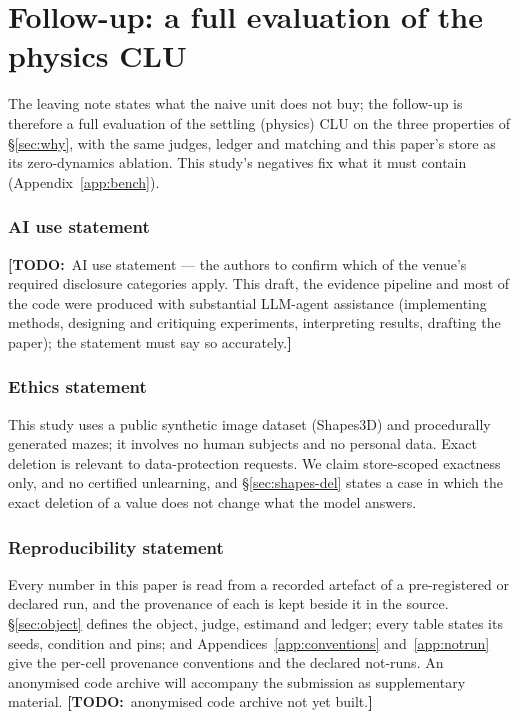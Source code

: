 \documentclass{article} %
\newcommand{\TODO}[1]{{\color{orange}\textbf{[TODO:}~#1\textbf{]}}}
\begin{document}
\section{Follow-up: a full evaluation of the physics CLU}
\label{sec:followup}

The leaving note states what the naive unit does not buy; the follow-up is therefore a full evaluation of the settling (physics) CLU on the three properties of \S\ref{sec:why}, with the same judges, ledger and matching and this paper's store as its zero-dynamics ablation. This study's negatives fix what it must contain (Appendix~\ref{app:bench}).

\subsubsection*{AI use statement}
\TODO{AI use statement --- the authors to confirm which of the venue's required disclosure categories
apply. This draft, the evidence pipeline and most of the code were produced with substantial LLM-agent
assistance (implementing methods, designing and critiquing experiments, interpreting results,
drafting the paper); the statement must say so accurately.}

\subsubsection*{Ethics statement}
This study uses a public synthetic image dataset (Shapes3D) and procedurally generated mazes; it
involves no human subjects and no personal data. Exact deletion is relevant to data-protection
requests. We claim store-scoped exactness only, and no certified unlearning, and
\S\ref{sec:shapes-del} states a case in which the exact deletion of a value does not change what
the model answers.

\subsubsection*{Reproducibility statement}
Every number in this paper is read from a recorded artefact of a pre-registered or declared run,
and the provenance of each is kept beside it in the source. \S\ref{sec:object} defines the
object, judge, estimand and ledger; every table states its seeds, condition and pins; and
Appendices~\ref{app:conventions} and~\ref{app:notrun} give the per-cell provenance conventions and
the declared not-runs. An anonymised code archive will accompany the submission as
supplementary material. \TODO{anonymised code archive not yet built.}
\end{document}
